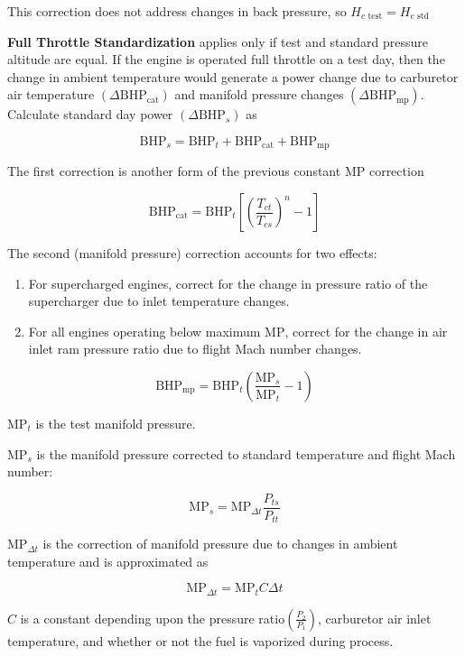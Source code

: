 \documentclass[
]{book}
\providecommand{\tightlist}{%
  \setlength{\itemsep}{0pt}\setlength{\parskip}{0pt}}
\begin{document}
This correction does not address changes in back pressure, so \(H_{c \text{ test}} = H_{c \text{ std}}\)

\textbf{Full Throttle Standardization} applies only if test and standard pressure altitude are equal. If the engine is operated full throttle on a test day, then the change in ambient temperature would generate a power change due to carburetor air temperature \(\left( \Delta \mathrm{BHP}_{\mathrm{cat}} \right)\) and manifold pressure changes \(\left( \Delta \mathrm{BHP}_{\mathrm{mp}} \right)\). Calculate standard day power \(\left( \Delta \mathrm{BHP}_s \right)\) as

\[
\mathrm{BHP}_s = \mathrm{BHP}_t + \mathrm{BHP}_{\mathrm{cat}} + \mathrm{BHP}_{\mathrm{mp}}
\]

The first correction is another form of the previous constant \(\mathrm{MP}\) correction

\[
\mathrm{BHP}_{\mathrm{cat}} = \mathrm{BHP}_t \left[ \left( \frac{T_{ct}}{T_{cs}} \right)^n - 1 \right]
\]

The second (manifold pressure) correction accounts for two effects:

\begin{enumerate}
\def\labelenumi{\arabic{enumi}.}
\tightlist
\item
  For supercharged engines, correct for the change in pressure ratio of the supercharger due to inlet temperature changes.
\item
  For all engines operating below maximum \(\mathrm{MP}\), correct for the change in air inlet ram pressure ratio due to flight Mach number changes.
\end{enumerate}

\[
\mathrm{BHP}_{\mathrm{mp}} = \mathrm{BHP}_t \left( \frac{\mathrm{MP}_s}{\mathrm{MP}_t} -1 \right)
\]

\(\mathrm{MP}_t\) is the test manifold pressure.

\(\mathrm{MP}_s\) is the manifold pressure corrected to standard temperature and flight Mach number:

\[
\mathrm{MP}_s = \mathrm{MP}_{\Delta t} \frac{P_{ts}}{P_{tt}}
\]

\(\mathrm{MP}_{\Delta t}\) is the correction of manifold pressure due to changes in ambient temperature and is approximated as

\[
\mathrm{MP}_{\Delta t} = \mathrm{MP}_t C \Delta t
\]

\(C\) is a constant depending upon the pressure ratio\(\left( \frac{P_2}{P_1} \right)\), carburetor air inlet temperature, and whether or not the fuel is vaporized during process.
\end{document}
